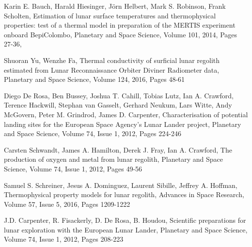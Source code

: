 \documentclass[prl,onecolumn]{revtex4-1}  %
\begin{document}
\begin{thebibliography}{99}
Karin E. Bauch, Harald Hiesinger, Jörn Helbert, Mark S. Robinson, Frank Scholten,
Estimation of lunar surface temperatures and thermophysical properties: test of a thermal model in preparation of the MERTIS experiment onboard BepiColombo,
Planetary and Space Science,
Volume 101,
2014,
Pages 27-36,

Shuoran Yu, Wenzhe Fa,
Thermal conductivity of surficial lunar regolith estimated from Lunar Reconnaissance Orbiter Diviner Radiometer data,
Planetary and Space Science,
Volume 124,
2016,
Pages 48-61


Diego De Rosa, Ben Bussey, Joshua T. Cahill, Tobias Lutz, Ian A. Crawford, Terence Hackwill, Stephan van Gasselt, Gerhard Neukum, Lars Witte, Andy McGovern, Peter M. Grindrod, James D. Carpenter,
Characterisation of potential landing sites for the European Space Agency's Lunar Lander project,
Planetary and Space Science,
Volume 74, Issue 1,
2012,
Pages 224-246



Carsten Schwandt, James A. Hamilton, Derek J. Fray, Ian A. Crawford,
The production of oxygen and metal from lunar regolith,
Planetary and Space Science,
Volume 74, Issue 1,
2012,
Pages 49-56


Samuel S. Schreiner, Jesus A. Dominguez, Laurent Sibille, Jeffrey A. Hoffman,
Thermophysical property models for lunar regolith,
Advances in Space Research,
Volume 57, Issue 5,
2016,
Pages 1209-1222

J.D. Carpenter, R. Fisackerly, D. De Rosa, B. Houdou,
Scientific preparations for lunar exploration with the European Lunar Lander,
Planetary and Space Science,
Volume 74, Issue 1,
2012,
Pages 208-223

 \end{thebibliography}
\end{document}
